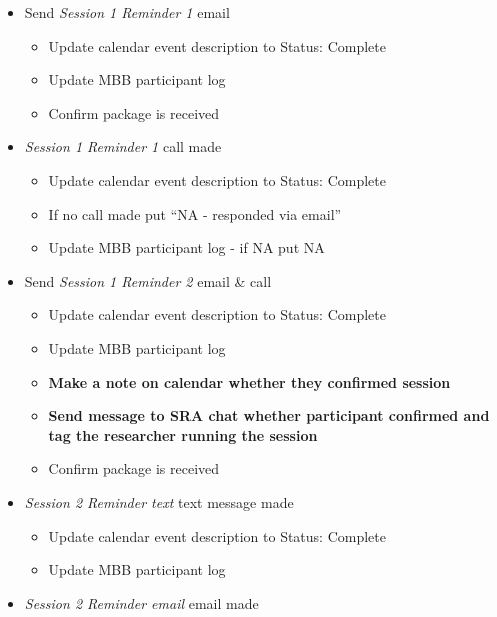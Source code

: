 \documentclass[
]{book}
\providecommand{\tightlist}{%
  \setlength{\itemsep}{0pt}\setlength{\parskip}{0pt}}
\begin{document}
\begin{itemize}
\tightlist
\item
  Send \emph{Session 1 Reminder 1} email

  \begin{itemize}
  \tightlist
  \item
    Update calendar event description to Status: Complete
  \item
    Update MBB participant log\\
  \item
    Confirm package is received
  \end{itemize}
\item
  \emph{Session 1 Reminder 1} call made

  \begin{itemize}
  \tightlist
  \item
    Update calendar event description to Status: Complete\\
  \item
    If no call made put ``NA - responded via email''
  \item
    Update MBB participant log - if NA put NA\\
  \end{itemize}
\item
  Send \emph{Session 1 Reminder 2} email \& call

  \begin{itemize}
  \tightlist
  \item
    Update calendar event description to Status: Complete
  \item
    Update MBB participant log
  \item
    \textbf{Make a note on calendar whether they confirmed session}
  \item
    \textbf{Send message to SRA chat whether participant confirmed and tag the researcher running the session}
  \item
    Confirm package is received
  \end{itemize}
\item
  \emph{Session 2 Reminder text} text message made

  \begin{itemize}
  \tightlist
  \item
    Update calendar event description to Status: Complete
  \item
    Update MBB participant log
  \end{itemize}
\item
  \emph{Session 2 Reminder email} email made


\end{itemize}
\end{document}
